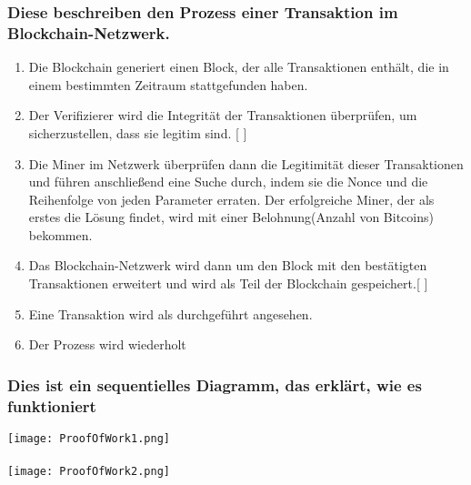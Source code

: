 \documentclass[ngerman]{scrreprt}
\begin{document}
\subsubsection{Diese beschreiben den Prozess einer Transaktion im Blockchain-Netzwerk.}
\begin{enumerate}
	\item Die Blockchain generiert einen Block, der alle Transaktionen enthält, die in einem bestimmten Zeitraum stattgefunden haben.
	\item Der Verifizierer wird die Integrität der Transaktionen überprüfen, um sicherzustellen, dass sie legitim sind. [ \cite{btc-echo-proof-of-work} ]
	\item Die Miner im Netzwerk überprüfen dann die Legitimität dieser Transaktionen und führen anschließend eine Suche durch, indem sie die Nonce und die Reihenfolge von jeden Parameter erraten. Der erfolgreiche Miner, der als erstes die Lösung findet, wird mit einer Belohnung(Anzahl von Bitcoins) bekommen.
	\item Das Blockchain-Netzwerk wird dann um den Block mit den bestätigten Transaktionen erweitert und wird als Teil der Blockchain gespeichert.[ \cite{btc-echo-proof-of-work} ]
	\item Eine Transaktion wird als durchgeführt angesehen.
	\item Der Prozess wird wiederholt \\
\end{enumerate}
\subsubsection{Dies ist ein sequentielles Diagramm, das erklärt, wie es funktioniert}
\texttt{[image: ProofOfWork1.png]} \\ \\
\texttt{[image: ProofOfWork2.png]}
\end{document}
